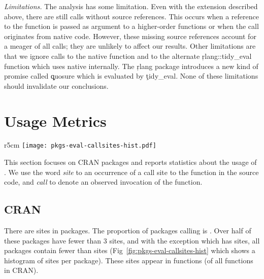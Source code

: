 \documentclass[review,screen,acmsmall,anonymous=true]{acmart}
\newcommand{\mypara}[1]{\medskip\noindent\emph{#1}\xspace}
\begin{document}
\mypara{Limitations.} The analysis has some limitation. Even with the extension
described above, there are still \PkgUndefinedRnd \eval calls without source
references. This occurs when a reference to the \eval function is passed as
argument to a higher-order functions or when the \eval call originates from
native code. However, these missing source references account for a meager
\PkgUndefinedRatio of all calls; they are unlikely to affect our results. Other
limitations are that we ignore calls to the native \eval function and to the
alternate \c{rlang::tidy\_eval} function which uses native \eval internally.
The \c{rlang} package introduces a new kind of promise called \c{quosure} which
is evaluated by \c{tidy\_eval}. None of these limitations should invalidate our
conclusions.

\section{Usage Metrics}

\begin{wrapfigure}{r}{5cm} \hspace*{-12mm}
  \centering
  \texttt{[image: pkgs-eval-callsites-hist.pdf]} \caption{CRAN
  \eval call sites}%
  \label{fig:pkgs-eval-callsites-hist}
\end{wrapfigure}
%
This section focuses on CRAN packages and reports statistics about the usage of
\eval. We use the word \emph{site} to an occurrence of a call site to the \eval
function in the source code, and \emph{call} to denote an observed invocation of
the \eval function.

\subsection{CRAN}

There are \PkgEvalCallSites \eval sites in \PkgPackages packages. The proportion
of packages calling \eval is \PkgPackagesRatio. Over half of these packages
have fewer than 3 sites, and with the exception \MaxEvalCallSitesPackage which
has \MaxEvalCallSitesCount sites, all packages contain fewer than
\MaxEvalCallSitesRest sites (\cf Fig~\ref{fig:pkgs-eval-callsites-hist} which
shows a histogram of sites per package). These sites appear in \PkgFunsWithEval
functions (\CranFunsWithEvalRatio of all functions in CRAN).
\end{document}
